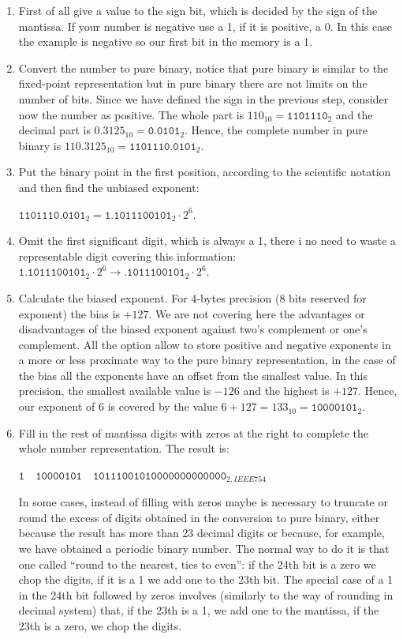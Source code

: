 \begin{enumerate}
    \item First of all give a value to the sign bit, which is decided by the sign of the mantissa. If your number is negative use a 1, if it is positive, a 0. In this case the example is negative so our first bit in the memory is a 1.
    
    \item Convert the number to pure binary, notice that pure binary is similar to the fixed-point representation but in pure binary there are not limits on the number of bits. Since we have defined the sign in the previous step, consider now the number as positive. The whole part is $110_{10}=\texttt{1101110}_2$ and the decimal part is $0.3125_{10}=\texttt{0.0101}_2$. Hence, the complete number in pure binary is $110.3125_{10}=\texttt{1101110.0101}_2$. 
    
    \item Put the binary point in the first position, according to the scientific notation and then find the unbiased exponent:
    
     $\texttt{1101110.0101}_2=\texttt{1.1011100101}_2\cdot2^6$.
    
    \item Omit the first significant digit, which is always a 1, there i no need to waste a representable digit covering this information: $\texttt{1.1011100101}_2\cdot2^6 \rightarrow \texttt{.1011100101}_2\cdot2^6$.
    
    \item Calculate the biased exponent. For 4-bytes precision (8 bits reserved for exponent) the bias is $+127$. We are not covering here the advantages or disadvantages of the biased exponent against two's complement or one's complement. All the option allow to store positive and negative exponents in a more or less proximate way to the pure binary representation, in the case of the bias all the exponents have an offset from the smallest value. In this precision, the smallest available value is $-126$ and the highest is $+127$. Hence, our exponent of $6$ is covered by the value $6+127 = 133_{10}= \texttt{10000101}_2$. 
    
    \item Fill in the rest of mantissa digits with zeros at the right to complete the whole number representation. The result is: 
    
    $\texttt{1}\quad \texttt{10000101}\quad \texttt{10111001010000000000000}_{2, IEEE 754}$
    
    In some cases, instead of filling with zeros maybe is necessary to truncate or round the excess of digits obtained in the conversion to pure binary, either because the result has more than 23 decimal digits or because, for example, we have obtained a periodic binary number. The normal way to do it is that one called ``round to the nearest, ties to even'': if the 24th bit is a zero we chop the digits, if it is a 1 we add one to the 23th bit. The special case of a 1 in the 24th bit followed by zeros involves (similarly to the way of rounding in decimal system) that, if the 23th is a 1, we add one to the mantissa, if the 23th is a zero, we chop the digits. 
\end{enumerate}

